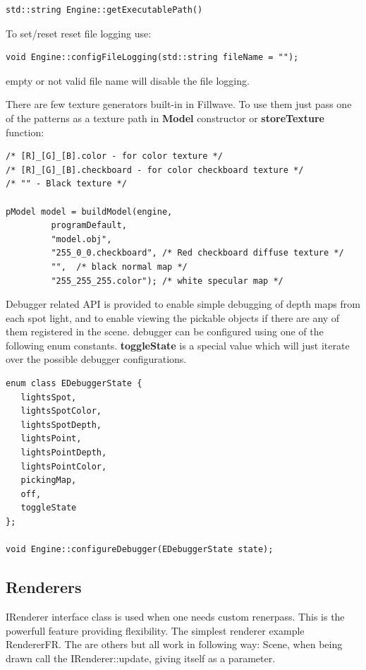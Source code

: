 \documentclass{article}
\begin{document}
\begin{lstlisting}
std::string Engine::getExecutablePath()
\end{lstlisting}

\indent To set/reset reset file logging use:

\begin{lstlisting}
void Engine::configFileLogging(std::string fileName = "");
\end{lstlisting}

empty or not valid file name will disable the file logging.

\newpage

\indent There are few texture generators built-in in Fillwave. To use them just pass one of the patterns as a texture path in \textbf{Model} constructor or \textbf{storeTexture} function:
\begin{lstlisting}
/* [R]_[G]_[B].color - for color texture */
/* [R]_[G]_[B].checkboard - for color checkboard texture */
/* "" - Black texture */

pModel model = buildModel(engine,
         programDefault,
         "model.obj",
         "255_0_0.checkboard", /* Red checkboard diffuse texture */
         "",  /* black normal map */
         "255_255_255.color"); /* white specular map */
\end{lstlisting}

\indent \indent Debugger related API is provided to enable simple debugging of depth maps from each spot light, and to enable viewing the pickable objects if there are any of them registered in the scene. debugger can be configured using one of the following enum constants. \textbf{toggleState} is a special value which will just iterate over the possible debugger configurations.

\begin{lstlisting}
enum class EDebuggerState {
   lightsSpot,
   lightsSpotColor,
   lightsSpotDepth,
   lightsPoint,
   lightsPointDepth,
   lightsPointColor,
   pickingMap,
   off,
   toggleState
};

void Engine::configureDebugger(EDebuggerState state);
\end{lstlisting}

\newpage

\subsection{Renderers}\label{sec:Custom renderers}
\indent IRenderer interface class is used when one needs custom renerpass. This is the powerfull feature providing flexibility. The simplest renderer example RendererFR. The are others but all work in following way: Scene, when being drawn call the IRenderer::update, giving itself as a parameter.
\end{document}
